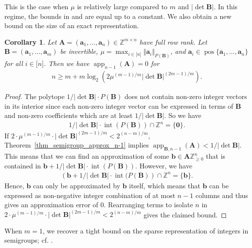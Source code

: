 \documentclass[pdflatex]{sn-jnl}
\DeclareMathOperator{\app}{app}
\DeclareMathOperator{\intt}{int}
\DeclareMathOperator{\pos}{pos}
\newcommand{\Z}{\mathbb{Z}}
\newcommand{\bA}{\bm{A}}
\newcommand{\bb}{\bm{b}}
\newcommand{\ba}{\bm{a}}
\newcommand{\bB}{\bm{B}}
\theoremstyle{thmstyleone}%
\newtheorem{corollary}{Corollary}
\theoremstyle{thmstyletwo}%
\theoremstyle{thmstylethree}%
\begin{document}
	This is the case when $\mu$ is relatively large compared to $m$ and $\left|\det\bB\right|$. In this regime, the bounds in \cite{alievdeloesparelindio2017} and \cite{eisenbrandshmonincaratheodorybounds06} are equal up to a constant. We also obtain a new bound on the size of an exact representation.
	\begin{corollary}
		\label{cor_semigroup_approx_to_exact}
		Let $\bA = (\ba_1,\ldots,\ba_n)\in\Z^{m\times n}$ have full row rank. Let $\bB = (\ba_1,\ldots,\ba_m)$ be invertible, $\mu = \max_{i\in\lbrack n\rbrack}\Vert\ba_i\Vert_{P(\bB)}$, and $\ba_i\in \pos\lbrace \ba_1,\ldots,\ba_n\rbrace$ for all $i\in\lbrack n\rbrack$. Then we have $\app_{n-1}(\bA) = 0$ for 
		\begin{align*}
			n\geq m + m\log_2({2}\mu^{(m-1)/m}\left|\det\bB\right|^{(2m-1)/m}).
		\end{align*}
	\end{corollary}
	\begin{proof}
		The polytope $1/\left|\det\bB\right|\cdot P(\bB)$ does not contain non-zero integer vectors in its interior since each non-zero integer vector can be expressed in terms of $\bB$ and non-zero coefficients which are at least $1/\left|\det\bB\right|$. So we have
		\begin{align*}
			1/\left|\det\bB\right|\cdot \intt(P(\bB))\cap\Z^n = \lbrace\bm{0}\rbrace. 
		\end{align*}
		If ${2\cdot}\mu^{(m-1)/m}\cdot\left|\det\bB\right|^{(2m-1)/m} < 2^{(n-m)/m}$, Theorem~\ref{thm_semigroup_approx_n-1} implies $\app_{\bB,n-1}(\bA) < 1/\left|\det\bB\right|$. 
		This means that we can find an approximation of some $\bb\in\bA\Z^n_{\geq 0}$ that is contained in $\bb + 1/\left|\det\bB\right|\cdot\intt( P(\bB))$.
		However, we have 
		\begin{align*}
			\left(\bb + 1/\left|\det\bB\right|\cdot\intt( P(\bB)\right) \cap \Z^n = \lbrace \bb\rbrace.	
		\end{align*}
		Hence, $\bb$ can only be approximated by $\bb$ itself, which means that $\bb$ can be expressed as non-negative integer combination of at most $n-1$ columns and thus gives an approximation error of $0$.
		Rearranging terms to isolate $n$ in ${2\cdot}\mu^{(m-1)/m}\cdot\left|\det\bB\right|^{(2m-1)/m} < 2^{(n-m)/m}$ gives the claimed bound.
	\end{proof}
	When $m=1$, we recover a tight bound on the sparse representation of integers in semigroups; cf. \cite[Theorem 3]{alievAverkovLoeraOertel21}.  
	
\end{document}
